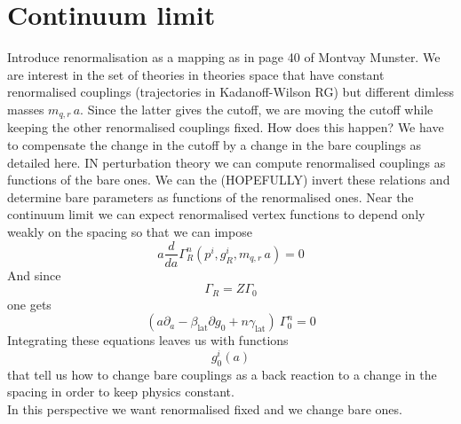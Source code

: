 \section{Continuum limit}
\label{sec:continuum_limit}
Introduce renormalisation as a mapping as in page 40 of Montvay Munster.
We are interest in the set of theories in theories space that have constant renormalised couplings (trajectories in Kadanoff-Wilson RG) but different dimless masses $m_{q,r} \, a$. Since the latter gives the cutoff, we are moving the cutoff while keeping the other renormalised couplings fixed. How does this happen? We have to compensate the change in the cutoff by a change in the bare couplings as detailed here. IN perturbation theory we can compute renormalised couplings as functions of the bare ones. We can the (HOPEFULLY) invert these relations and determine bare parameters as functions of the renormalised ones. Near the continuum limit we can expect renormalised vertex functions to depend only weakly on the spacing so that we can impose
\begin{equation*}
    a \frac{d}{da} \Gamma_R^n(p^i, g^i_R, m_{q,r} \, a) = 0
\end{equation*}
And since 
\begin{equation*}
    \Gamma_R = Z \Gamma_0
\end{equation*}
one gets
\begin{equation*}
    \left(a\partial_a - \beta_\text{lat} \partial g_0 + n \gamma_\text{lat}\right) \ \Gamma_0^n = 0
\end{equation*}
Integrating these equations leaves us with functions
\begin{equation*}
    g_0^i(a)
\end{equation*}
that tell us how to change bare couplings as a back reaction to a change in the spacing in order to keep physics constant. \\
In this perspective we want renormalised fixed and we change bare ones. 